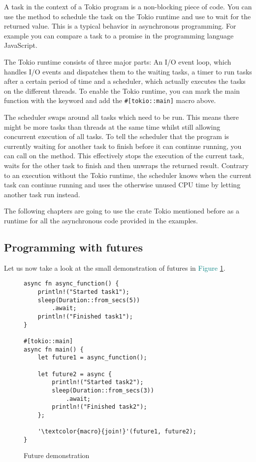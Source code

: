 A task in the context of a Tokio program is a non-blocking piece of code. You can use the 
method to schedule the task on the Tokio runtime and use  to wait for the returned value. This is a typical
behavior in asynchronous programming. For example you can compare a task to a promise in the programming language
JavaScript.

The Tokio runtime consists of three major parts: An I/O event loop, which handles I/O events and dispatches them to the
waiting tasks, a timer to run tasks after a certain period of time and a scheduler, which actually executes the tasks
on the different threads. To enable the Tokio runtime, you can mark the main function with the  keyword and
add the \texttt{#[tokio::main]} macro above.

The scheduler swaps around all tasks which need to be run. This means there might be more tasks than threads at the
same time whilst still allowing concurrent execution of all tasks. To tell the scheduler that the program is currently
waiting for another task to finish before it can continue running, you can call  on the method. This
effectively stops the execution of the current task, waits for the other task to finish and then unwraps the returned
result. Contrary to an execution without the Tokio runtime, the scheduler knows when the current task can continue
running and uses the otherwise unused CPU time by letting another task run instead.

The following chapters are going to use the crate Tokio mentioned before as a runtime for all the asynchronous code
provided in the examples.

\subsection{Programming with futures}
Let us now take a look at the small demonstration of futures in \textcolor{teal}{Figure \ref{future}}.

\begin{figure}[ht]
    \begin{verbatim}
async fn async_function() {
    println!("Started task1");
    sleep(Duration::from_secs(5))
        .await;
    println!("Finished task1");
}

#[tokio::main]
async fn main() {
    let future1 = async_function();

    let future2 = async {
        println!("Started task2");
        sleep(Duration::from_secs(3))
            .await;
        println!("Finished task2");
    };

    '\textcolor{macro}{join!}'(future1, future2);
}
    \end{verbatim}
    \caption{Future demonstration}
    \label{future}
\end{figure}

